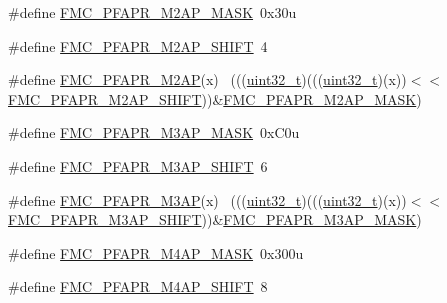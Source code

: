 \begin{DoxyCompactItemize}
\item 
\#define \hyperlink{group___f_m_c___register___masks_gab3e23f648e34da06b351ac745476f30c}{F\+M\+C\+\_\+\+P\+F\+A\+P\+R\+\_\+\+M2\+A\+P\+\_\+\+M\+A\+SK}~0x30u
\item 
\#define \hyperlink{group___f_m_c___register___masks_ga05f65455021f093de56e9e086f7185ee}{F\+M\+C\+\_\+\+P\+F\+A\+P\+R\+\_\+\+M2\+A\+P\+\_\+\+S\+H\+I\+FT}~4
\item 
\#define \hyperlink{group___f_m_c___register___masks_ga601ae7a66d0d789ff410c2ad8993a9e6}{F\+M\+C\+\_\+\+P\+F\+A\+P\+R\+\_\+\+M2\+AP}(x)                                            ~(((\hyperlink{_p_e___types_8h_a33594304e786b158f3fb30289278f5af}{uint32\+\_\+t})(((\hyperlink{_p_e___types_8h_a33594304e786b158f3fb30289278f5af}{uint32\+\_\+t})(x))$<$$<$\hyperlink{group___f_m_c___register___masks_ga05f65455021f093de56e9e086f7185ee}{F\+M\+C\+\_\+\+P\+F\+A\+P\+R\+\_\+\+M2\+A\+P\+\_\+\+S\+H\+I\+FT}))\&\hyperlink{group___f_m_c___register___masks_gab3e23f648e34da06b351ac745476f30c}{F\+M\+C\+\_\+\+P\+F\+A\+P\+R\+\_\+\+M2\+A\+P\+\_\+\+M\+A\+SK})
\item 
\#define \hyperlink{group___f_m_c___register___masks_gae2347dc5794bb1de5793cd2a1c31854f}{F\+M\+C\+\_\+\+P\+F\+A\+P\+R\+\_\+\+M3\+A\+P\+\_\+\+M\+A\+SK}~0x\+C0u
\item 
\#define \hyperlink{group___f_m_c___register___masks_gacb37659011a95dffc2216ccedfafb212}{F\+M\+C\+\_\+\+P\+F\+A\+P\+R\+\_\+\+M3\+A\+P\+\_\+\+S\+H\+I\+FT}~6
\item 
\#define \hyperlink{group___f_m_c___register___masks_ga7f6be124f97a870ea97c73ff56f1ffbf}{F\+M\+C\+\_\+\+P\+F\+A\+P\+R\+\_\+\+M3\+AP}(x)                                            ~(((\hyperlink{_p_e___types_8h_a33594304e786b158f3fb30289278f5af}{uint32\+\_\+t})(((\hyperlink{_p_e___types_8h_a33594304e786b158f3fb30289278f5af}{uint32\+\_\+t})(x))$<$$<$\hyperlink{group___f_m_c___register___masks_gacb37659011a95dffc2216ccedfafb212}{F\+M\+C\+\_\+\+P\+F\+A\+P\+R\+\_\+\+M3\+A\+P\+\_\+\+S\+H\+I\+FT}))\&\hyperlink{group___f_m_c___register___masks_gae2347dc5794bb1de5793cd2a1c31854f}{F\+M\+C\+\_\+\+P\+F\+A\+P\+R\+\_\+\+M3\+A\+P\+\_\+\+M\+A\+SK})
\item 
\#define \hyperlink{group___f_m_c___register___masks_ga7a4045976082b3e527eddd6a51204aaa}{F\+M\+C\+\_\+\+P\+F\+A\+P\+R\+\_\+\+M4\+A\+P\+\_\+\+M\+A\+SK}~0x300u
\item 
\#define \hyperlink{group___f_m_c___register___masks_gab5d59455fa080c08cf37d632a2b698cc}{F\+M\+C\+\_\+\+P\+F\+A\+P\+R\+\_\+\+M4\+A\+P\+\_\+\+S\+H\+I\+FT}~8

\end{DoxyCompactItemize}
